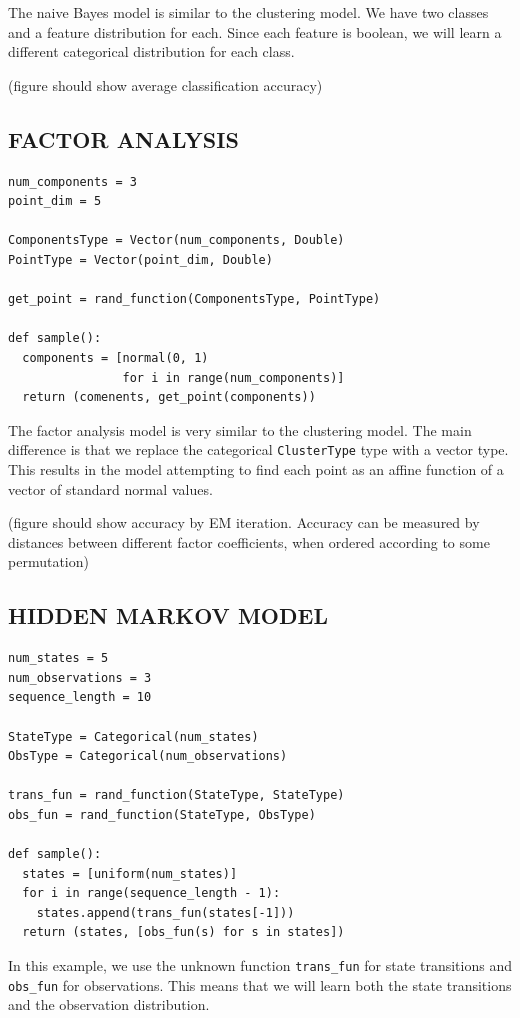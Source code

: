 \documentclass[proceed]{article}
\begin{document}
The naive Bayes model is similar to the clustering model.  We have two classes and a feature
distribution for each.  Since each feature is boolean, we will learn
a different categorical distribution for each class.

(figure should show average classification accuracy)

  \subsection{FACTOR ANALYSIS}
{\small
\begin{verbatim}
num_components = 3
point_dim = 5

ComponentsType = Vector(num_components, Double)
PointType = Vector(point_dim, Double)

get_point = rand_function(ComponentsType, PointType)

def sample():
  components = [normal(0, 1)
                for i in range(num_components)]
  return (comenents, get_point(components))
\end{verbatim}
}

The factor analysis model is very similar to the clustering model.  The main difference is that we replace the categorical \texttt{ClusterType} type with a vector type.  This results in the model attempting to find each point as an affine function of a vector of standard normal values.

(figure should show accuracy by EM iteration.  Accuracy can be measured by distances between different factor coefficients, when ordered according to some permutation)
  \subsection{HIDDEN MARKOV MODEL}
{\small
\begin{verbatim}
num_states = 5
num_observations = 3
sequence_length = 10

StateType = Categorical(num_states)
ObsType = Categorical(num_observations)

trans_fun = rand_function(StateType, StateType)
obs_fun = rand_function(StateType, ObsType)

def sample():
  states = [uniform(num_states)]
  for i in range(sequence_length - 1):
    states.append(trans_fun(states[-1]))
  return (states, [obs_fun(s) for s in states])
\end{verbatim}
}

In this example, we use the unknown function \texttt{trans\_fun} for state transitions and \texttt{obs\_fun} for observations.  This means that we will learn both the state transitions and the observation distribution.
\end{document}
